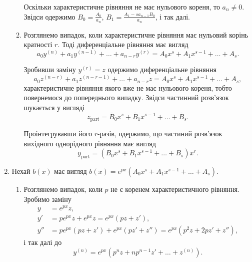 \begin{enumerate}
\begin{enumerate}
		Оскільки характеристичне рівняння не має нульового кореня, то $a_n \ne 0$. Звідси одержимо $B_0 = \frac{A_0}{a_n}$, $B_1 = \frac{A_1 - s a_{n - 1} B_0}{a_n}$, і так далі.

		\item Розглянемо випадок, коли характеристичне рівняння має нульовий корінь кратності $r$. Тоді диференціальне рівняння має вигляд
		\begin{equation*}
			a_0 y^{(n)} + a_1 y^{(n - 1)} + \ldots + a_{n - r} y^{(r)} = A_0 x^s + A_1 x^{s - 1} + \ldots + A_s.
		\end{equation*}

		Зробивши заміну $y^{(r)} = z$ одержимо диференціальне рівняння 
		\begin{equation*}
			a_0 z^{(n - r)} + a_1 z^{(n - r - 1)} + \ldots + a_{n - r} z = A_0 x^s + A_1 x^{s - 1} + \ldots + A_s,
		\end{equation*}
		характеристичне рівняння якого вже не має нульового кореня, тобто повернемося до попереднього випадку. Звідси частинний розв'язок шукається у вигляді
		\begin{equation*}
			z_{\text{part}} = \bar B_0 x^s + \bar B_1 x^{s - 1} + \ldots + \bar B_s.
		\end{equation*}

 		Проінтегрувавши його $r$-разів, одержимо, що частиний роз\-в'яз\-ок вихідного однорідного рівняння має вигляд
 		\begin{equation*}
			y_{\text{part}} = \left(B_0 x^s + B_1 x^{s - 1} + \ldots + B_s\right) x^r.
		\end{equation*}
 	\end{enumerate}
 	
	\item Нехай $b(x)$ має вигляд $b(x) = e^{px} \left( A_0 x^s + A_1 x^{s - 1} + \ldots + A_s \right)$.
	\begin{enumerate}
		\item Розглянемо випадок, коли $p$ не є коренем характеристичного рівняння. Зробимо заміну
		\begin{align*}
			y &= e^{p x} z, \\
			y' &= p e^{p x} z + e^{p x} z = e^{p x} (p z + z'), \\
			y'' &= p e^{p x} (p z + z') + e^{p x} (p z' + z'') = e^{p x} (p^2 z + 2 p z' + z''),
		\end{align*}
 		і так далі до
 		\begin{equation*}
 			y^{(n)} = e^{p x} \left( p^n z + n p^{n - 1} z' + \ldots + z^{(n)} \right).
 		\end{equation*}
		

\end{enumerate}
\end{enumerate}

